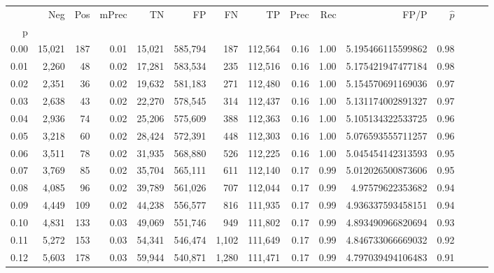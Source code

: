 \begin{tabular}{rrrrrrrrrrrrrrr}
\toprule
{} &     Neg &    Pos & mPrec &       TN &       FP &       FN &       TP &  Prec &   Rec &                  FP/P & $\hat{p}$ \\
p    &         &        &       &          &          &          &          &       &       &                       &           \\
\midrule
0.00 &  15,021 &    187 &  0.01 &   15,021 &  585,794 &      187 &  112,564 &  0.16 &  1.00 &     5.195466115599862 &      0.98 \\
0.01 &   2,260 &     48 &  0.02 &   17,281 &  583,534 &      235 &  112,516 &  0.16 &  1.00 &     5.175421947477184 &      0.98 \\
0.02 &   2,351 &     36 &  0.02 &   19,632 &  581,183 &      271 &  112,480 &  0.16 &  1.00 &     5.154570691169036 &      0.97 \\
0.03 &   2,638 &     43 &  0.02 &   22,270 &  578,545 &      314 &  112,437 &  0.16 &  1.00 &     5.131174002891327 &      0.97 \\
0.04 &   2,936 &     74 &  0.02 &   25,206 &  575,609 &      388 &  112,363 &  0.16 &  1.00 &     5.105134322533725 &      0.96 \\
0.05 &   3,218 &     60 &  0.02 &   28,424 &  572,391 &      448 &  112,303 &  0.16 &  1.00 &     5.076593555711257 &      0.96 \\
0.06 &   3,511 &     78 &  0.02 &   31,935 &  568,880 &      526 &  112,225 &  0.16 &  1.00 &     5.045454142313593 &      0.95 \\
0.07 &   3,769 &     85 &  0.02 &   35,704 &  565,111 &      611 &  112,140 &  0.17 &  0.99 &     5.012026500873606 &      0.95 \\
0.08 &   4,085 &     96 &  0.02 &   39,789 &  561,026 &      707 &  112,044 &  0.17 &  0.99 &      4.97579622353682 &      0.94 \\
0.09 &   4,449 &    109 &  0.02 &   44,238 &  556,577 &      816 &  111,935 &  0.17 &  0.99 &     4.936337593458151 &      0.94 \\
0.10 &   4,831 &    133 &  0.03 &   49,069 &  551,746 &      949 &  111,802 &  0.17 &  0.99 &     4.893490966820694 &      0.93 \\
0.11 &   5,272 &    153 &  0.03 &   54,341 &  546,474 &    1,102 &  111,649 &  0.17 &  0.99 &     4.846733066669032 &      0.92 \\
0.12 &   5,603 &    178 &  0.03 &   59,944 &  540,871 &    1,280 &  111,471 &  0.17 &  0.99 &     4.797039494106483 &      0.91 \\

\end{tabular}
